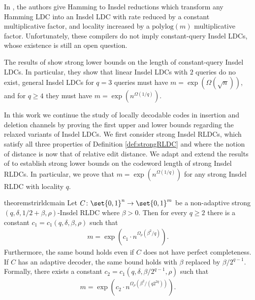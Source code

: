 \documentclass[10pt,a4paper]{article}
\theoremstyle{remark}
\newcommand{\polylog}{\ensuremath{\mathrm{polylog}}\xspace}
\newcommand{\tuple}[1]{\ensuremath{\left(#1\right)}}
\newcommand{\tp}{\tuple}
\newcommand{\authnote}[3]{\textcolor{#2}{{\sf (#1's Note: {\sl{#3}})}}}
\newcommand{\jeremiah}{\authnote{Jeremiah}{blue}}
\newcommand{\enote}{\authnote{Elena}{green}}
\newcommand{\authnote}{}
\newcommand{\jeremiah}[1]{}
\newcommand{\enote}[1]{}
\begin{document}
In \cite{Ostrovsky-InsdelLDC-Compiler,BlockBGKZ20}, the authors give Hamming to Insdel reductions which transform any Hamming LDC into an Insdel LDC with rate reduced by a constant multiplicative factor, and locality increased by a  $\polylog(m)$ multiplicative factor. Unfortunately, these compilers do not imply constant-query Insdel LDCs, whose existence is still an open question.


 The results of \cite{blocki2021exponential} show  strong lower bounds on the length of constant-query Insdel LDCs. In particular, they show that  linear Insdel LDCs with $2$  queries do no exist,  general Insdel LDCs for $q= 3$ queries must have  $m=\exp(\Omega(\sqrt{n}))$, and for $q\geq 4$ they must have $m=\exp(n^{\Omega(1/q)}).$ 
 
 
 In this work we continue the study of locally decodable codes in insertion and deletion channels by proving the first upper and lower bounds regarding the relaxed variants of Insdel LDCs. %
 We first consider strong Insdel RLDCs, which satisfy all three properties of Definition \ref{def:strongRLDC} and where the notion of distance is now that of relative edit distance. We adapt and extend the results of \cite{blocki2021exponential} to establish strong lower bounds on the codeword length of strong Insdel RLDCs. In particular, we prove that $m= \exp(n^{\Omega(1/q)})$ for any strong Insdel RLDC with locality $q$.
 
 
 \begin{restatable}{theorem}{strirldcmain} \label{thm:main-sinsdel RLDC}
	Let $C \colon \set{0,1}^n \rightarrow \set{0,1}^m$ be a non-adaptive strong $(q,\delta,1/2+\beta,\rho)$-Insdel RLDC where $\beta>0$. Then for every $q\ge 2$ there is a constant $c_1=c_1(q,\delta,\beta,\rho)$ such that  
	\begin{align*}
	    m = \exp\tp{c_1\cdot n^{\Omega_{\rho}(\beta^2/q)}}.
	\end{align*}
	Furthermore, the same bound holds even if $C$ does not have perfect completeness. If $C$ has an adaptive decoder, the same bound holds with $\beta$ replaced by $\beta/2^{q-1}$. Formally, there exists a constant $c_2=c_1(q,\delta,\beta/2^{q-1},\rho)$ such that
	\begin{align*}
	    m = \exp\tp{c_2\cdot n^{\Omega_{\rho}(\beta^2/(q2^{2q}))}}.
	\end{align*}
\end{restatable} 
\end{document}
